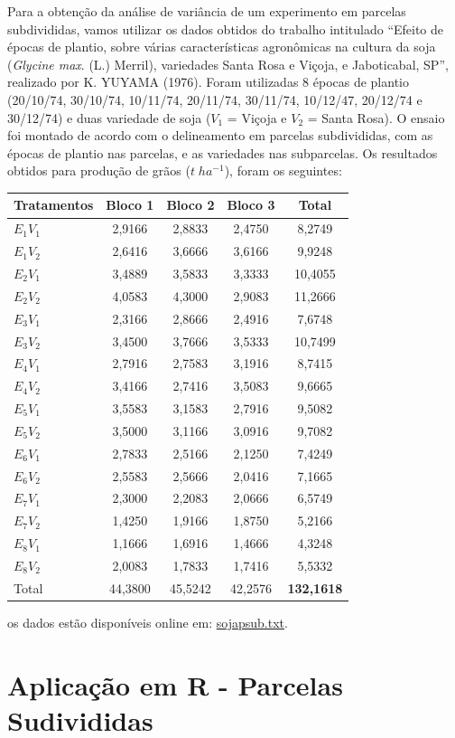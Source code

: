 \documentclass[
]{book}
\begin{document}
Para a obtenção da análise de variância de um experimento em parcelas subdivididas, vamos utilizar os dados obtidos do trabalho intitulado ``Efeito de épocas de plantio, sobre várias características agronômicas na cultura da soja (\emph{Glycine max}. (L.) Merril), variedades Santa Rosa e Viçoja, e Jaboticabal, SP'', realizado por K. YUYAMA (1976). Foram utilizadas 8 épocas de plantio (20/10/74, 30/10/74, 10/11/74, 20/11/74, 30/11/74, 10/12/47, 20/12/74 e 30/12/74) e duas variedade de soja (\(V_1\) = Viçoja e \(V_2\) = Santa Rosa). O ensaio foi montado de acordo com o delineamento em parcelas subdivididas, com as épocas de plantio nas parcelas, e as variedades nas subparcelas. Os resultados obtidos para produção de grãos (\(t\;ha^{-1}\)), foram os seguintes:

\begin{longtable}[]{@{}lcccc@{}}
\toprule
Tratamentos & Bloco 1 & Bloco 2 & Bloco 3 & Total\tabularnewline
\midrule
\endhead
\(E_1V_1\) & 2,9166 & 2,8833 & 2,4750 & 8,2749\tabularnewline
\(E_1V_2\) & 2,6416 & 3,6666 & 3,6166 & 9,9248\tabularnewline
\(E_2V_1\) & 3,4889 & 3,5833 & 3,3333 & 10,4055\tabularnewline
\(E_2V_2\) & 4,0583 & 4,3000 & 2,9083 & 11,2666\tabularnewline
\(E_3V_1\) & 2,3166 & 2,8666 & 2,4916 & 7,6748\tabularnewline
\(E_3V_2\) & 3,4500 & 3,7666 & 3,5333 & 10,7499\tabularnewline
\(E_4V_1\) & 2,7916 & 2,7583 & 3,1916 & 8,7415\tabularnewline
\(E_4V_2\) & 3,4166 & 2,7416 & 3,5083 & 9,6665\tabularnewline
\(E_5V_1\) & 3,5583 & 3,1583 & 2,7916 & 9,5082\tabularnewline
\(E_5V_2\) & 3,5000 & 3,1166 & 3,0916 & 9,7082\tabularnewline
\(E_6V_1\) & 2,7833 & 2,5166 & 2,1250 & 7,4249\tabularnewline
\(E_6V_2\) & 2,5583 & 2,5666 & 2,0416 & 7,1665\tabularnewline
\(E_7V_1\) & 2,3000 & 2,2083 & 2,0666 & 6,5749\tabularnewline
\(E_7V_2\) & 1,4250 & 1,9166 & 1,8750 & 5,2166\tabularnewline
\(E_8V_1\) & 1,1666 & 1,6916 & 1,4666 & 4,3248\tabularnewline
\(E_8V_2\) & 2,0083 & 1,7833 & 1,7416 & 5,5332\tabularnewline
Total & 44,3800 & 45,5242 & 42,2576 & \textbf{132,1618}\tabularnewline
\bottomrule
\end{longtable}

os dados estão disponíveis online em: \href{https://raw.githubusercontent.com/arpanosso/ExpAgr_2020/master/dados/sojapsub.txt}{sojapsub.txt}.

\hypertarget{aplicauxe7uxe3o-em-r---parcelas-sudivididas}{%
\section{Aplicação em R - Parcelas Sudivididas}\label{aplicauxe7uxe3o-em-r---parcelas-sudivididas}}
\end{document}
